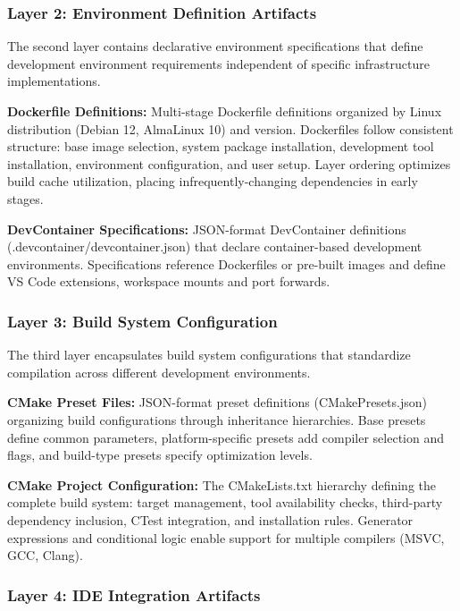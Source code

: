 \subsubsection{Layer 2: Environment Definition Artifacts}

The second layer contains declarative environment specifications that define development environment requirements independent of specific infrastructure implementations.

\textbf{Dockerfile Definitions:} Multi-stage Dockerfile definitions organized by Linux distribution (Debian 12, AlmaLinux 10) and version.
Dockerfiles follow consistent structure: base image selection, system package installation, development tool installation, environment configuration, and user setup.
Layer ordering optimizes build cache utilization, placing infrequently-changing dependencies in early stages.

\textbf{DevContainer Specifications:} JSON-format DevContainer definitions (.devcontainer/devcontainer.json) that declare container-based development environments.
Specifications reference Dockerfiles or pre-built images and define VS Code extensions, workspace mounts and port forwards.

\subsubsection{Layer 3: Build System Configuration}

The third layer encapsulates build system configurations that standardize compilation across different development environments.

\textbf{CMake Preset Files:} JSON-format preset definitions (CMakePresets.json) organizing build configurations through inheritance hierarchies.
Base presets define common parameters, platform-specific presets add compiler selection and flags, and build-type presets specify optimization levels.

\textbf{CMake Project Configuration:} The CMakeLists.txt hierarchy defining the complete build system: target management, tool availability checks, third-party dependency inclusion, CTest integration, and installation rules.
Generator expressions and conditional logic enable support for multiple compilers (MSVC, GCC, Clang).

\subsubsection{Layer 4: IDE Integration Artifacts}

